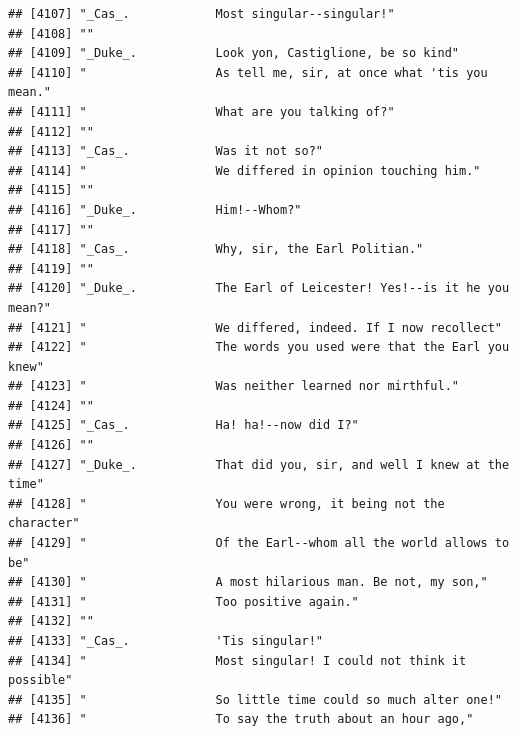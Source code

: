\documentclass{article}\usepackage[]{graphicx}\usepackage[]{color}
\makeatletter
\newenvironment{kframe}{%
 \def\at@end@of@kframe{}%
 \ifinner\ifhmode%
  \def\at@end@of@kframe{\end{minipage}}%
  \begin{minipage}{\columnwidth}%
 \fi\fi%
 \def\FrameCommand##1{\hskip\@totalleftmargin \hskip-\fboxsep
 \colorbox{shadecolor}{##1}\hskip-\fboxsep
     \hskip-\linewidth \hskip-\@totalleftmargin \hskip\columnwidth}%
 \MakeFramed {\advance\hsize-\width
   \@totalleftmargin\z@ \linewidth\hsize
   \@setminipage}}%
 {\par\unskip\endMakeFramed%
 \at@end@of@kframe}
\newenvironment{knitrout}{}{} %
\makeatother
\begin{document}
\begin{knitrout}
\begin{kframe}
\begin{verbatim}
## [4107] "_Cas_.            Most singular--singular!"                                  
## [4108] ""                                                                            
## [4109] "_Duke_.           Look yon, Castiglione, be so kind"                         
## [4110] "                  As tell me, sir, at once what 'tis you mean."              
## [4111] "                  What are you talking of?"                                  
## [4112] ""                                                                            
## [4113] "_Cas_.            Was it not so?"                                            
## [4114] "                  We differed in opinion touching him."                      
## [4115] ""                                                                            
## [4116] "_Duke_.           Him!--Whom?"                                               
## [4117] ""                                                                            
## [4118] "_Cas_.            Why, sir, the Earl Politian."                              
## [4119] ""                                                                            
## [4120] "_Duke_.           The Earl of Leicester! Yes!--is it he you mean?"           
## [4121] "                  We differed, indeed. If I now recollect"                   
## [4122] "                  The words you used were that the Earl you knew"            
## [4123] "                  Was neither learned nor mirthful."                         
## [4124] ""                                                                            
## [4125] "_Cas_.            Ha! ha!--now did I?"                                       
## [4126] ""                                                                            
## [4127] "_Duke_.           That did you, sir, and well I knew at the time"            
## [4128] "                  You were wrong, it being not the character"                
## [4129] "                  Of the Earl--whom all the world allows to be"              
## [4130] "                  A most hilarious man. Be not, my son,"                     
## [4131] "                  Too positive again."                                       
## [4132] ""                                                                            
## [4133] "_Cas_.            'Tis singular!"                                            
## [4134] "                  Most singular! I could not think it possible"              
## [4135] "                  So little time could so much alter one!"                   
## [4136] "                  To say the truth about an hour ago,"                       

\end{verbatim}
\end{kframe}
\end{knitrout}
\end{document}
